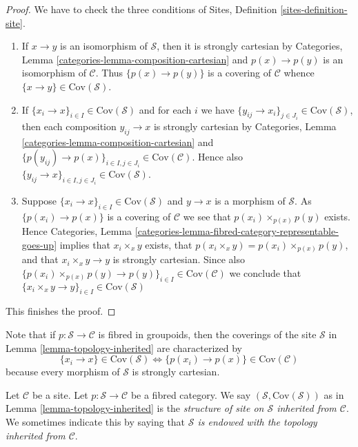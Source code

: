 \begin{proof}
We have to check the three conditions of
Sites, Definition \ref{sites-definition-site}.
\begin{enumerate}
\item If $x \to y$ is an isomorphism of $\mathcal{S}$, then
it is strongly cartesian by
Categories, Lemma \ref{categories-lemma-composition-cartesian}
and $p(x) \to p(y)$ is an isomorphism of $\mathcal{C}$. Thus
$\{p(x) \to p(y)\}$ is a covering of $\mathcal{C}$ whence
$\{x \to y\} \in \text{Cov}(\mathcal{S})$.
\item If $\{x_i \to x\}_{i\in I} \in \text{Cov}(\mathcal{S})$ and for each
$i$ we have $\{y_{ij} \to x_i\}_{j\in J_i} \in \text{Cov}(\mathcal{S})$, then
each composition $y_{ij} \to x$ is strongly cartesian by
Categories, Lemma \ref{categories-lemma-composition-cartesian}
and $\{p(y_{ij}) \to p(x)\}_{i \in I, j\in J_i} \in \text{Cov}(\mathcal{C})$.
Hence also $\{y_{ij} \to x\}_{i \in I, j\in J_i} \in \text{Cov}(\mathcal{S})$.
\item Suppose $\{x_i \to x\}_{i\in I}\in \text{Cov}(\mathcal{S})$
and $y \to x$ is a morphism of $\mathcal{S}$. As $\{p(x_i) \to p(x)\}$
is a covering of $\mathcal{C}$ we see that $p(x_i) \times_{p(x)} p(y)$
exists. Hence
Categories, Lemma \ref{categories-lemma-fibred-category-representable-goes-up}
implies that $x_i \times_x y$ exists, that $p(x_i \times_x y) =
p(x_i) \times_{p(x)} p(y)$, and that $x_i \times_x y \to y$ is
strongly cartesian. Since also
$\{p(x_i) \times_{p(x)} p(y) \to p(y) \}_{i\in I} \in \text{Cov}(\mathcal{C})$
we conclude that
$\{x_i \times_x y \to y \}_{i\in I} \in \text{Cov}(\mathcal{S})$
\end{enumerate}
This finishes the proof.
\end{proof}

\noindent
Note that if $p : \mathcal{S} \to \mathcal{C}$ is fibred in groupoids, then
the coverings of the site $\mathcal{S}$ in
Lemma \ref{lemma-topology-inherited}
are characterized by
$$
\{x_i \to x\} \in \text{Cov}(\mathcal{S})
\Leftrightarrow
\{p(x_i) \to p(x)\} \in \text{Cov}(\mathcal{C})
$$
because every morphism of $\mathcal{S}$ is strongly cartesian.

\begin{definition}
\label{definition-topology-inherited}
Let $\mathcal{C}$ be a site. Let $p : \mathcal{S} \to \mathcal{C}$ be a
fibred category. We say $(\mathcal{S}, \text{Cov}(\mathcal{S}))$ as in
Lemma \ref{lemma-topology-inherited}
is the {\it structure of site on $\mathcal{S}$ inherited from $\mathcal{C}$}.
We sometimes indicate this by saying that
{\it $\mathcal{S}$ is endowed with the topology inherited from $\mathcal{C}$}.
\end{definition}

